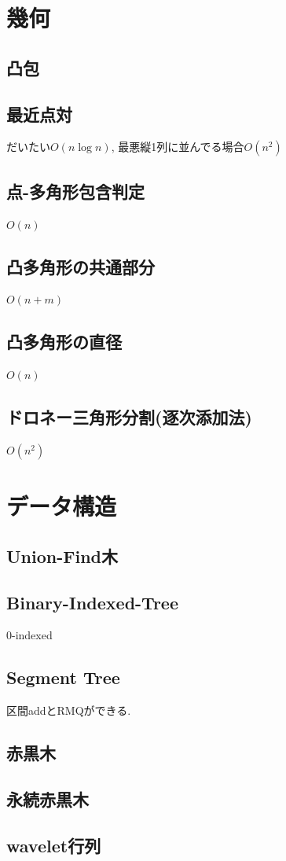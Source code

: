 \documentclass[9pt,twocolumn,a4paper,landscape]{extarticle}
\begin{document}
\section{幾何}

\subsection{凸包}

\subsection{最近点対}
だいたい$O(n\log n)$, 最悪縦1列に並んでる場合$O(n^2)$

\subsection{点-多角形包含判定}
$O(n)$

\subsection{凸多角形の共通部分}
$O(n+m)$

\subsection{凸多角形の直径}
$O(n)$

\subsection{ドロネー三角形分割(逐次添加法)}
$O(n^2)$




\section{データ構造}
\subsection{Union-Find木}

\subsection{Binary-Indexed-Tree}
0-indexed

\subsection{Segment Tree}
区間addとRMQができる.

\subsection{赤黒木}

\subsection{永続赤黒木}

\subsection{wavelet行列}

\end{document}
